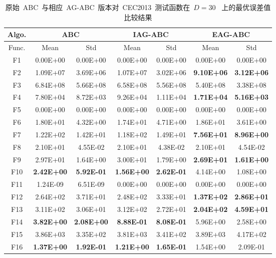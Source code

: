 \begin{table*}[!ht]
  \centering
  \caption{原始~ABC~与相应~AG-ABC~版本对~CEC2013~测试函数在~$D=30$~ 上的最优误差值比较结果}
  \scriptsize
    \begin{tabular}{|c|cc|cc|cc|}
    \hline
    Algo.  & \multicolumn{2}{c|}{ABC} & \multicolumn{2}{c|}{IAG-ABC} & \multicolumn{2}{c|}{EAG-ABC} \\
    \hline
    Func.   & Mean  & Std   & Mean  & Std   & Mean  & Std \\ \hline
    F1    & 0.00E+00 & 0.00E+00 & 0.00E+00 & 0.00E+00 & 0.00E+00 & 0.00E+00 \\
    F2    & 1.09E+07 & 3.69E+06 & 1.07E+07 & 3.02E+06 & \textbf{9.10E+06} & \textbf{3.12E+06} \\
    F3    & 6.84E+08 & 5.66E+08 & 6.58E+08 & 5.56E+08 & 5.40E+08 & 3.38E+08 \\
    F4    & 7.80E+04 & 8.72E+03 & 9.26E+04 & 1.11E+04 & \textbf{1.71E+04} & \textbf{5.16E+03} \\
    F5    & 0.00E+00 & 0.00E+00 & 0.00E+00 & 0.00E+00 & 0.00E+00 & 0.00E+00 \\
    \hline
    F6    & 1.80E+01 & 4.32E+00 & 1.74E+01 & 4.71E+00 & 1.86E+01 & 3.61E+00 \\
    F7    & 1.22E+02 & 1.42E+01 & 1.18E+02 & 1.49E+01 & \textbf{7.56E+01} & \textbf{8.96E+00} \\
    F8    & 2.10E+01 & 4.55E-02 & 2.10E+01 & 4.38E-02 & 2.10E+01 & 4.54E-02 \\
    F9    & 2.97E+01 & 1.64E+00 & 3.00E+01 & 1.79E+00 & \textbf{2.69E+01} & \textbf{1.61E+00} \\
    F10   & \textbf{2.42E+00} & \textbf{5.92E-01} & \textbf{1.56E+00} & \textbf{2.62E-01} & 4.14E+00 & 1.08E+00 \\
    F11   & 1.24E-09 & 6.51E-09 & 0.00E+00 & 0.00E+00 & 0.00E+00 & 0.00E+00 \\
    F12   & 2.64E+02 & 3.71E+01 & 2.48E+02 & 3.33E+01 & \textbf{1.37E+02} & \textbf{2.86E+01} \\
    F13   & 3.11E+02 & 3.06E+01 & 3.12E+02 & 2.72E+01 & \textbf{2.04E+02} & \textbf{4.59E+01} \\
    F14   & \textbf{3.82E+00} & \textbf{2.08E+00} & \textbf{8.88E-01} & \textbf{8.08E-01} & 5.96E+00 & 2.58E+00 \\
    F15   & 3.86E+03 & 3.35E+02 & 3.81E+03 & 3.41E+02 & 3.89E+03 & 4.17E+02 \\
    F16   & \textbf{1.37E+00} & \textbf{1.92E-01} & \textbf{1.21E+00} & \textbf{1.65E-01} & 1.54E+00 & 2.09E-01 \\

\end{tabular}
\end{table*}
